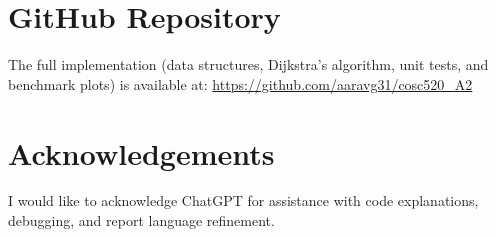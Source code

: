 \documentclass[acmsmall]{acmart}
\begin{document}
\section*{GitHub Repository}
The full implementation (data structures, Dijkstra’s algorithm, unit tests, and benchmark plots) is available at:  
\url{https://github.com/aaravg31/cosc520_A2}

\section*{Acknowledgements}
I would like to acknowledge ChatGPT \cite{chatgpt} for assistance with code explanations, debugging, and report language refinement.



\end{document}
